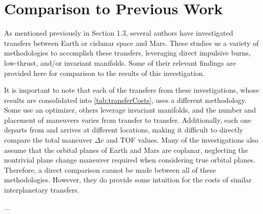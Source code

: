 \section{Comparison to Previous Work}
As mentioned previously in Section 1.3, several authors have investigated transfers between Earth
or cislunar space and Mars. These studies us a variety of methodologies to accomplish these
transfers, leveraging direct impulsive burns, low-thrust, and/or invariant manifolds. Some of their
relevant findings are provided here for comparison to the results of this investigation.

It is important to note that each of the transfers from these investigations, whose results are
consolidated into \cref{tab:transferCosts}, uses a different methodology. Some use an optimizer,
others leverage invariant manifolds, and the number and placement of maneuvers varies from transfer
to transfer. Additionally, each one departs from and arrives at different locations, making it
difficult to directly compare the total maneuver $\Delta v$ and TOF values. Many of the
investigations also assume that the orbital planes of Earth and Mars are coplanar, neglecting the
nontrivial plane change maneuver required when considering true orbital planes. Therefore, a direct
comparison cannot be made between all of these methodologies. However, they do provide some
intuition for the costs of similar interplanetary transfers.

...


